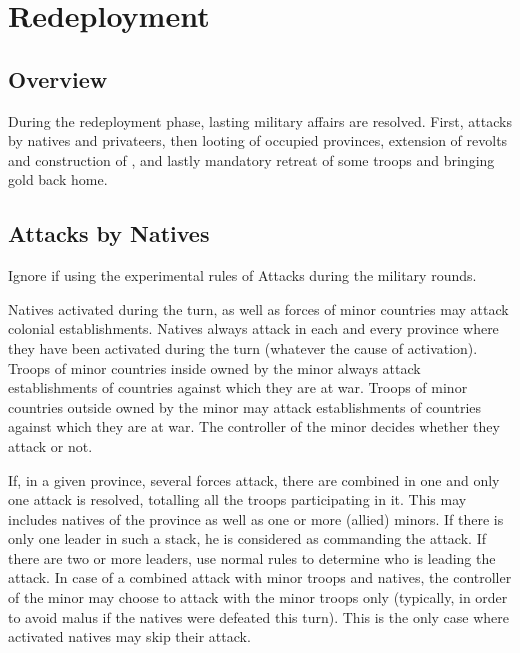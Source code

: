 
\chapter{Redeployment}\label{chapter:Redep}


\section{Overview}

\aparag During the redeployment phase, lasting military affairs are
resolved. First, attacks by natives and privateers, then looting of
occupied provinces, extension of revolts and construction of \Presidios,
and lastly mandatory retreat of some troops and bringing \ROTW gold back
home.

\aparag[Sequence.]
\RedepDetails

\section{Attacks by Natives}\label{chRedep:Native Attack}
\begin{designnote}
  Ignore if using the experimental rules of Attacks during the military
  rounds.
\end{designnote}

\aparag Natives activated during the turn, as well as forces of \ROTW minor
countries may attack colonial establishments.
\bparag Natives always attack in each and every province where they have been
activated during the turn (whatever the cause of activation).
\bparag Troops of \ROTW minor countries inside \Areas owned by the minor
always attack establishments of countries against which they are at war.
\bparag Troops of \ROTW minor countries outside \Areas owned by the minor may
attack establishments of countries against which they are at war. The
controller of the minor decides whether they attack or not.

\bparag If, in a given province, several forces attack, there are combined in
one and only one attack is resolved, totalling all the troops participating in
it.
\bparag This may includes natives of the province as well as one or more
(allied) \ROTW minors.
\bparag If there is only one leader in such a stack, he is considered as
commanding the attack. If there are two or more leaders, use normal rules to
determine who is leading the attack.
\bparag In case of a combined attack with minor troops and natives, the
controller of the minor may choose to attack with the minor troops only
(typically, in order to avoid malus if the natives were defeated this
turn). This is the only case where activated natives may skip their attack.

